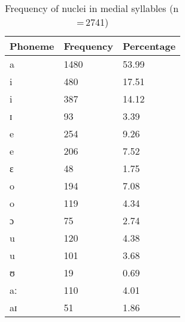 \begin{table}[pth]\centering
\caption[Frequency of nuclei in medial syllables]{Frequency of nuclei in medial syllables (n\,=\,2741)}
\begin{tabu} to 0.5\textwidth{X X[c] X[c]}
\tableheaderfont\toprule
Phoneme
	& Frequency
	& Percentage
	\\
	
\toprule

a
	& 1480
	& 53.99\pct
	\\

\midrule

i
	& 480
	& 17.51\pct
	\\

\rowfont{\scriptsize\itshape}
\raggedleft
i
	& 387
	& 14.12\pct
	\\

\rowfont{\scriptsize\itshape}
\raggedleft
ɪ
	& 93
	& 3.39\pct
	\\

\midrule

e
	& 254
	& 9.26\pct
	\\

\rowfont{\scriptsize\itshape}
\raggedleft
e
	& 206
	& 7.52\pct
	\\

\rowfont{\scriptsize\itshape}
\raggedleft
ɛ
	& 48
	& 1.75\pct
	\\

\midrule

o
	& 194
	& 7.08\pct
	\\

\rowfont{\scriptsize\itshape}
\raggedleft
o
	& 119
	& 4.34\pct
	\\

\rowfont{\scriptsize\itshape}
\raggedleft
ɔ
	& 75
	& 2.74\pct
	\\

\midrule

u
	& 120
	& 4.38\pct
	\\

\rowfont{\scriptsize\itshape}
\raggedleft
u
	& 101
	& 3.68\pct
	\\

\rowfont{\scriptsize\itshape}
\raggedleft
ʊ
	& 19
	& 0.69\pct
	\\

\midrule

aː
	& 110
	& 4.01\pct
	\\

aɪ
	& 51
	& 1.86\pct
	\\


\end{tabu}
\end{table}
